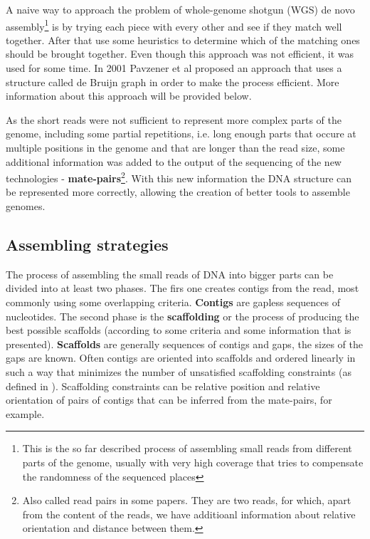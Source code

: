 \documentclass[11pt]{article}
\begin{document}
A naive way to approach the problem of whole-genome shotgun (WGS) de novo
assembly\footnote{This is the so far described process of assembling small reads
from different parts of the genome, usually with very high coverage that tries
to compensate the randomness of the sequenced places} is by trying each piece
with every other and see if they match well together. After that use some
heuristics to determine which of the matching ones should be brought together.
Even though this approach was not efficient, it was used for some time. In 2001
Pavzener et al \cite{pevzner-et-all-2001} proposed an approach that uses a structure
called de Bruijn graph in order to make the process efficient. More information
about this approach will be provided below.

As the short reads were not sufficient to represent more complex parts of the
genome, including some partial repetitions, i.e. long enough parts that occure at
multiple positions in the genome and that are longer than the read size, some additional information was
added to the output of the sequencing of the new technologies -
\textbf{mate-pairs}\footnote{Also called read pairs in some papers. They are two
reads, for which, apart from the content of the reads, we have additioanl
information about relative orientation and distance between them.}. With this
new information the DNA structure can be represented more correctly, allowing
the creation of better tools to assemble genomes.


\subsection{Assembling strategies}
\label{sub:Assembling strategies}
The process of assembling the small reads of DNA into bigger parts can be
divided into at least two phases. The firs one creates contigs from the read,
most commonly using some overlapping criteria. \textbf{Contigs} are gapless
sequences of nucleotides. The second phase is the \textbf{scaffolding} or the
process of producing the best possible scaffolds (according to some criteria and
some information that is presented). \textbf{Scaffolds} are generally sequences of contigs and gaps,
the sizes of the gaps are known. Often contigs are oriented into scaffolds and ordered linearly in such a way that
minimizes the number of unsatisfied scaffolding constraints (as defined in
\cite{grass}). Scaffolding constraints can be relative position and relative
orientation of pairs of contigs that can be inferred from the mate-pairs, for
example.
\end{document}
